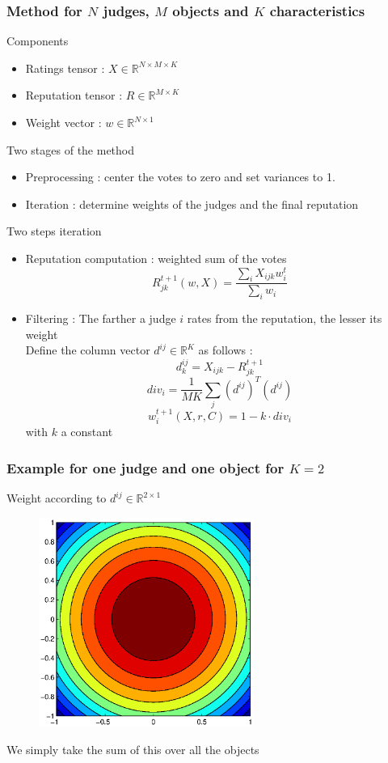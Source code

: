 \begin{frame}
\frametitle{Method for $N$ judges, $M$ objects and $K$ characteristics}
\begin{block}{Components}
\begin{itemize}
\item Ratings tensor : $X \in \mathbb{R}^{N\times M \times K}$
\item Reputation tensor : $R \in \mathbb{R}^{M\times K}$
\item Weight vector : $w \in \mathbb{R}^{N\times 1}$
\end{itemize}
\end{block}
\begin{block}{Two stages of the method}
\begin{itemize}
\item Preprocessing : center the votes to zero and set variances to 1.
\item Iteration : determine weights of the judges and the final reputation
\end{itemize}
\end{block}
\end{frame}

\begin{frame}
\begin{block}{Two steps iteration}
\begin{itemize}
\item Reputation computation : weighted sum of the votes
$$R_{jk}^{t+1}(w,X) = \frac{\sum_{i}X_{ijk}w^t_{i}}{\sum_i w_{i}}$$
\item Filtering : The farther a judge $i$ rates from the reputation, the lesser its weight\\
Define the column vector $d^{ij} \in \mathbb{R}^K$ as follows :
$$ d^{ij}_k = X_{ijk}-R^{t+1}_{jk}$$
$$div_i =  \frac{1}{MK}\sum_{j} (d^{ij})^T (d^{ij})$$
$$w_i^{t+1}(X,r,C) = 1 -k \cdot div_i$$
with $k$ a constant 
\end{itemize}
\end{block}
\end{frame}
\begin{frame}
\frametitle{Example for one judge and one object for $K=2$}
\begin{block}{}
Weight according to $d^{ij}\in \mathbb{R}^{2\times 1}$
\begin{figure}
\centering
\includegraphics[width = 7cm]{../rapport/images/courbes.eps}
\end{figure}
We simply take the sum of this over all the objects
\end{block}
\end{frame}


